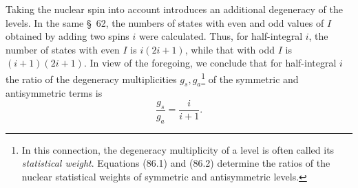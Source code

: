 Taking the nuclear spin into account introduces an additional degeneracy of the levels. In the same \S~62, the numbers of states with even and odd values of $I$ obtained by adding two spins $i$ were calculated. Thus, for half-integral $i$, the number of states with even $I$ is $i(2i+1)$, while that with odd $I$ is $(i+1)(2i+1)$. In view of the foregoing, we conclude that for half-integral $i$ the ratio of the degeneracy multiplicities $g_s,g_a$\footnote{In this connection, the degeneracy multiplicity of a level is often called its \emph{statistical weight}. Equations (86.1) and (86.2) determine the ratios of the nuclear statistical weights of symmetric and antisymmetric levels.} of the symmetric and antisymmetric terms is
\begin{equation}
 \frac{g_s}{g_a}=\frac{i}{i+1}.
 \tag{86.1}
\end{equation}
